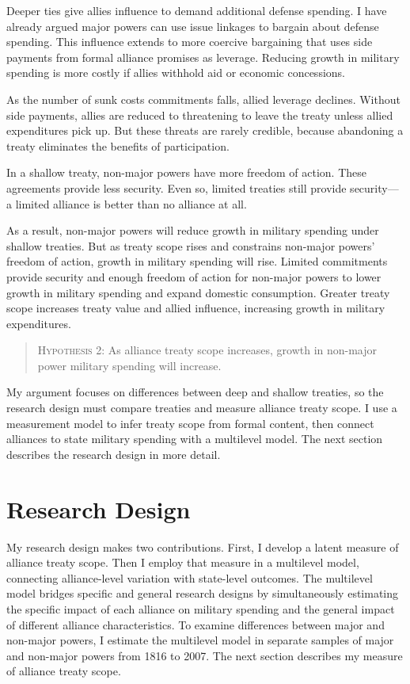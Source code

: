 \documentclass[12pt]{article}
\begin{document}
Deeper ties give allies influence to demand additional defense spending. 
I have already argued major powers can use issue linkages to bargain about defense spending. 
This influence extends to more coercive bargaining that uses side payments from formal alliance promises as leverage. 
Reducing growth in military spending is more costly if allies withhold aid or economic concessions. 


As the number of sunk costs commitments falls, allied leverage declines. 
Without side payments, allies are reduced to threatening to leave the treaty unless allied expenditures pick up. 
But these threats are rarely credible, because abandoning a treaty eliminates the benefits of participation. 


In a shallow treaty, non-major powers have more freedom of action.  
These agreements provide less security.  
Even so, limited treaties still provide security--- a limited alliance is better than no alliance at all. 


As a result, non-major powers will reduce growth in military spending under shallow treaties. 
But as treaty scope rises and constrains non-major powers' freedom of action, growth in military spending will rise. 
Limited commitments provide security and enough freedom of action for non-major powers to lower growth in military spending and expand domestic consumption. 
Greater treaty scope increases treaty value and allied influence, increasing growth in military expenditures. 


\begin{quote}
\textsc{Hypothesis 2}: As alliance treaty scope increases, growth in non-major power military spending will increase. 
\end{quote}


My argument focuses on differences between deep and shallow treaties, so the research design must compare treaties and measure alliance treaty scope.  
I use a measurement model to infer treaty scope from formal content, then connect alliances to state military spending with a multilevel model. 
The next section describes the research design in more detail. 



\section{Research Design} 


My research design makes two contributions. 
First, I develop a latent measure of alliance treaty scope. 
Then I employ that measure in a multilevel model, connecting alliance-level variation with state-level outcomes. 
The multilevel model bridges specific and general research designs by simultaneously estimating the specific impact of each alliance on military spending and the general impact of different alliance characteristics. 
To examine differences between major and non-major powers, I estimate the multilevel model in separate samples of major and non-major powers from 1816 to 2007. 
The next section describes my measure of alliance treaty scope. 
\end{document}
